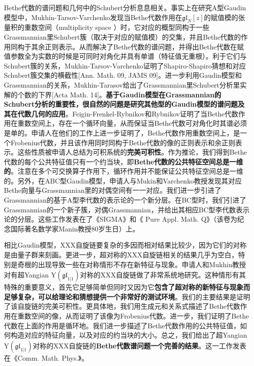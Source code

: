 \documentclass[12pt,UTF8,AutoFakeBold=4,a4paper]{ctexart}
\begin{document}
Bethe代数的谱问题和几何中的Schubert分析息息相关。事实上在研究A型Gaudin模型中，Mukhin-Tarsov-Varchenko发现当Bethe代数作用在$\mathfrak{gl}_N[z]$的赋值模的张量积的重数空间（multiplicity space ）时，它对应的概型同构于一些Grassmannian里Schubert簇（取决于对应的赋值模）的交集，并且Bethe代数的作用同构于其余正则表示。从而解决了Bethe代数的谱问题，并得出Bethe代数在赋值参数全为实数的时候是可同时对角化并具有单谱（特征值无重根）。利于它们与Schubert簇的关系，Mukhin-Tarsov-Varchenko证明了Shapiro-Shapiro猜想和对应Schubert簇交集的横截性[Ann. Math. 09, JAMS 09]。进一步利用Gaudin模型和Grassmannian的关系，Mukhin-Tarasov给出了Grassmannian里Schubert分析里实解的个数的下界[Acta Math. 14]。\textbf{基于Gaudin模型在Grassmannian的Schubert分析的重要性，很自然的问题是研究其他型的Gaudin模型的谱问题及其在代数几何的应用}。Feigin-Frenkel-Rybnikov和Rybnikov证明了当Bethe代数作用在重数空间上，存在一个循环向量，从而保证当Bethe代数可对角化时其谱必须是单的。申请人在他们的工作上进一步证明了，Bethe代数作用重数空间上，是一个Frobenius代数，并且该作用同时同构于Bethe代数的像的正则表示和余正则表示。这些性质被申请人总结为可积系统的\textbf{完美可积性}。作为推论，我们得到Bethe代数的每个公共特征值只有一个约当块，即\textbf{Bethe代数的公共特征空间总是一维的}。注意在多个可交换算子作用下，循环作用并不能保证公共特征空间总是一维的。另外，在ABC型Gaudin模型，申请人与Mukin和Varchenko教授发现其对应Bethe向量与Grassmannian里的对偶空间有一一对应。我们进一步引进了Grassmannian的基于A型李代数的表示论的一个新分层。在BC型时，我们引进了Grassmannian的一个新子簇，对偶Grassmannian，并给出其相应BC型李代数表示论的分层。这些工作发表在了《SIGMA》和《 Pure Appl. Math. Q》（该卷为纪念国际著名数学家Manin教授80岁生日）上。

相比Gaudin模型，XXX自旋链要复杂的多因而相对结果比较少，因为它们的对称是由量子群来刻画。更进一步，超对称的XXX自旋链相关的结果几乎为空白，特别是奇根的出现导致一些在对称情形不存在新特征与现象。申请人和Mukhin教授对有超Yangian $\mathrm{Y}(\mathfrak{gl}_{1|1})$对称的XXX自旋链做了非常系统地研究。这种情形有其特殊的重要意义，首先它足够简单但同时又因为它\textbf{包含了超对称的新特征与现象而足够复杂，可以给理论和猜想提供一个非常好的测试环境}。我们的主要结果是证明了该自旋链的完美可积性。更具体地，我们用生成元和关系式描述了Bethe代数作用在重数空间的像，从而证明了该像为Frobenius代数。进一步，我们证明了Bethe代数在上面的作用是循环地。我们进一步描述了Bethe代数作用的公共特征值，如何构造对应的特征向量，以及对应的约当块的大小。总之，我们给出了超Yangian $\mathrm{Y}(\mathfrak{gl}_{1|1})$对称的XXX自旋链的\textbf{Bethe代数谱问题一个完善的结果}。这一工作发表在《Comm. Math. Phys.》。
\end{document}
